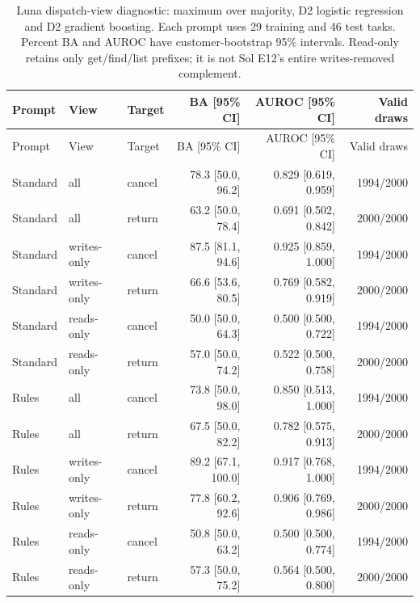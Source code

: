 {\footnotesize
\begin{longtable}{@{}lllrrr@{}}
\caption{Luna dispatch-view diagnostic: maximum over majority, D2 logistic regression and D2 gradient boosting. Each prompt uses 29 training and 46 test tasks. Percent BA and AUROC have customer-bootstrap 95\% intervals. Read-only retains only get/find/list prefixes; it is not Sol E12's entire writes-removed complement.}\label{tab:r7-luna-dispatch}\\
\toprule Prompt & View & Target & BA [95\% CI] & AUROC [95\% CI] & Valid draws\\\midrule\endfirsthead
\toprule Prompt & View & Target & BA [95\% CI] & AUROC [95\% CI] & Valid draws\\\midrule\endhead
Standard & all & cancel & 78.3 [50.0, 96.2] & 0.829 [0.619, 0.959] & 1994/2000\\
Standard & all & return & 63.2 [50.0, 78.4] & 0.691 [0.502, 0.842] & 2000/2000\\
Standard & writes-only & cancel & 87.5 [81.1, 94.6] & 0.925 [0.859, 1.000] & 1994/2000\\
Standard & writes-only & return & 66.6 [53.6, 80.5] & 0.769 [0.582, 0.919] & 2000/2000\\
Standard & reads-only & cancel & 50.0 [50.0, 64.3] & 0.500 [0.500, 0.722] & 1994/2000\\
Standard & reads-only & return & 57.0 [50.0, 74.2] & 0.522 [0.500, 0.758] & 2000/2000\\
Rules & all & cancel & 73.8 [50.0, 98.0] & 0.850 [0.513, 1.000] & 1994/2000\\
Rules & all & return & 67.5 [50.0, 82.2] & 0.782 [0.575, 0.913] & 2000/2000\\
Rules & writes-only & cancel & 89.2 [67.1, 100.0] & 0.917 [0.768, 1.000] & 1994/2000\\
Rules & writes-only & return & 77.8 [60.2, 92.6] & 0.906 [0.769, 0.986] & 2000/2000\\
Rules & reads-only & cancel & 50.8 [50.0, 63.2] & 0.500 [0.500, 0.774] & 1994/2000\\
Rules & reads-only & return & 57.3 [50.0, 75.2] & 0.564 [0.500, 0.800] & 2000/2000\\
\bottomrule\end{longtable}}
